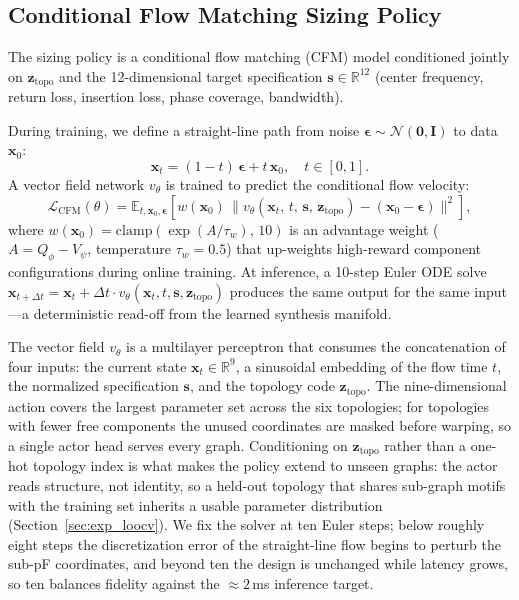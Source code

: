 \documentclass[sigconf,anonymous,review]{acmart}
\begin{document}
\subsection{Conditional Flow Matching Sizing Policy}
\label{sec:cfm}

The sizing policy is a conditional flow matching (CFM) model conditioned
jointly on $\mathbf{z}_\text{topo}$ and the 12-dimensional target
specification $\mathbf{s}\in\mathbb{R}^{12}$ (center frequency, return loss,
insertion loss, phase coverage, bandwidth).

During training, we define a straight-line path from noise
$\boldsymbol{\epsilon}\sim\mathcal{N}(\mathbf{0},\mathbf{I})$ to data
$\mathbf{x}_0$:
\begin{equation}
  \mathbf{x}_t = (1-t)\,\boldsymbol{\epsilon} + t\,\mathbf{x}_0,
  \quad t\in[0,1].
\end{equation}
A vector field network $v_\theta$ is trained to predict the conditional
flow velocity:
\begin{equation}
  \mathcal{L}_\text{CFM}(\theta)
  = \mathbb{E}_{t,\mathbf{x}_0,\boldsymbol{\epsilon}}\!\left[
    w(\mathbf{x}_0)\,
    \bigl\|v_\theta(\mathbf{x}_t,\,t,\,\mathbf{s},\,\mathbf{z}_\text{topo})
    - (\mathbf{x}_0 - \boldsymbol{\epsilon})\bigr\|^2
  \right],
\end{equation}
where $w(\mathbf{x}_0)=\mathrm{clamp}(\exp(A/\tau_w),\,10)$ is an
advantage weight ($A=Q_\phi-V_\psi$, temperature $\tau_w=0.5$) that
up-weights high-reward component configurations during online training.
At inference, a 10-step Euler ODE solve
$\mathbf{x}_{t+\Delta t}=\mathbf{x}_t+\Delta t\cdot
v_\theta(\mathbf{x}_t,t,\mathbf{s},\mathbf{z}_\text{topo})$
produces the same output for the same input---a deterministic read-off
from the learned synthesis manifold.

The vector field $v_\theta$ is a multilayer perceptron that consumes the
concatenation of four inputs: the current state $\mathbf{x}_t\in\mathbb{R}^9$,
a sinusoidal embedding of the flow time $t$, the normalized specification
$\mathbf{s}$, and the topology code $\mathbf{z}_\text{topo}$.  The
nine-dimensional action covers the largest parameter set across the six
topologies; for topologies with fewer free components the unused coordinates
are masked before warping, so a single actor head serves every graph.
Conditioning on $\mathbf{z}_\text{topo}$ rather than a one-hot topology index
is what makes the policy extend to unseen graphs: the actor reads structure,
not identity, so a held-out topology that shares sub-graph motifs with the
training set inherits a usable parameter distribution
(Section~\ref{sec:exp_loocv}).  We fix the solver at ten Euler steps; below
roughly eight steps the discretization error of the straight-line flow begins
to perturb the sub-pF coordinates, and beyond ten the design is unchanged
while latency grows, so ten balances fidelity against the ${\approx}2$\,ms
inference target.
\end{document}
